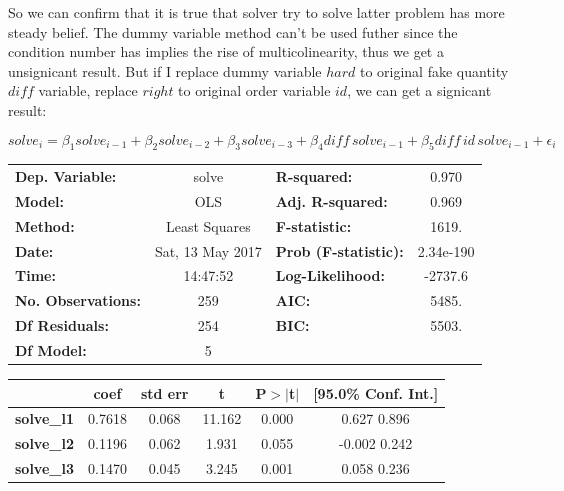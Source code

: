 \documentclass{article}
\begin{document}
So we can confirm that it is true that solver try to solve latter problem has more steady belief.
The dummy variable method can't be used futher since the condition number has implies the rise of multicolinearity,
thus we get a unsignicant result. But if I replace dummy variable $hard$ to original fake quantity $diff$ variable,
replace $right$ to original order variable $id$, we can get a signicant result:

\[
solve_i = \beta_1 solve_{i-1} + \beta_2 solve_{i-2} + \beta_3 solve_{i-3} + \beta_4 diff \, solve_{i-1} +
		  \beta_5 diff \, id \, solve_{i-1} + \epsilon_i
\]


\begin{center}
\begin{tabular}{lclc}
\toprule
\textbf{Dep. Variable:}    &      solve       & \textbf{  R-squared:         } &     0.970   \\
\textbf{Model:}            &       OLS        & \textbf{  Adj. R-squared:    } &     0.969   \\
\textbf{Method:}           &  Least Squares   & \textbf{  F-statistic:       } &     1619.   \\
\textbf{Date:}             & Sat, 13 May 2017 & \textbf{  Prob (F-statistic):} & 2.34e-190   \\
\textbf{Time:}             &     14:47:52     & \textbf{  Log-Likelihood:    } &   -2737.6   \\
\textbf{No. Observations:} &         259      & \textbf{  AIC:               } &     5485.   \\
\textbf{Df Residuals:}     &         254      & \textbf{  BIC:               } &     5503.   \\
\textbf{Df Model:}         &           5      & \textbf{                     } &             \\
\bottomrule
\end{tabular}
\begin{tabular}{lccccc}
                          & \textbf{coef} & \textbf{std err} & \textbf{t} & \textbf{P$>$$|$t$|$} & \textbf{[95.0\% Conf. Int.]}  \\
\midrule
\textbf{solve\_l1}         &       0.7618  &        0.068     &    11.162  &         0.000        &         0.627     0.896       \\
\textbf{solve\_l2}         &       0.1196  &        0.062     &     1.931  &         0.055        &        -0.002     0.242       \\
\textbf{solve\_l3}         &       0.1470  &        0.045     &     3.245  &         0.001        &         0.058     0.236       \\

\end{tabular}
\end{center}
\end{document}
